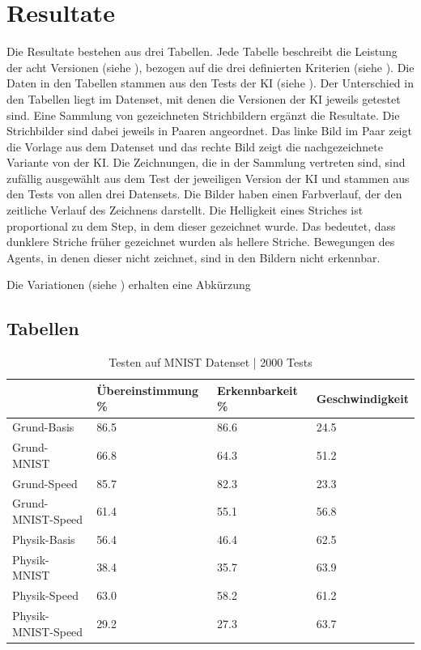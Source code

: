 \chapter{Resultate}\label{chap:r}
Die Resultate bestehen aus drei Tabellen. Jede Tabelle beschreibt die Leistung
der acht Versionen (siehe ), bezogen auf die drei
definierten Kriterien (siehe ). Die Daten in den Tabellen
stammen aus den Tests der KI (siehe ). Der Unterschied
in den Tabellen liegt im Datenset, mit denen die Versionen der KI jeweils
getestet sind. Eine Sammlung von gezeichneten Strichbildern ergänzt die
Resultate. Die Strichbilder sind dabei jeweils in Paaren angeordnet. Das linke
Bild im Paar zeigt die Vorlage aus dem Datenset und das rechte Bild zeigt die
nachgezeichnete Variante von der KI. Die Zeichnungen, die in der Sammlung
vertreten sind, sind zufällig ausgewählt aus dem Test der jeweiligen Version der
KI und stammen aus den Tests von allen drei Datensets. Die Bilder haben einen
Farbverlauf, der den zeitliche Verlauf des Zeichnens darstellt. Die Helligkeit
eines Striches ist proportional zu dem Step, in dem dieser gezeichnet wurde. Das
bedeutet, dass dunklere Striche früher gezeichnet wurden als hellere Striche.
Bewegungen des Agents, in denen dieser nicht zeichnet, sind in den Bildern nicht
erkennbar.


Die Variationen (siehe ) erhalten eine Abkürzung %


\newpage
\section{Tabellen}\label{chap:r_tab}
\begin{table}[!ht]
    \centering
    \caption{Testen auf MNIST Datenset | 2000 Tests}\label{tab:MNIST}
    \begin{tabular}{|l|l|l|l|}
        \hline
            ~ & Übereinstimmung \% & Erkennbarkeit \% & Geschwindigkeit \\ \hline
            Grund-Basis & 86.5 & 86.6 & 24.5 \\ \hline
            Grund-MNIST & 66.8 & 64.3 & 51.2 \\ \hline
            Grund-Speed & 85.7 & 82.3 & 23.3 \\ \hline
            Grund-MNIST-Speed & 61.4 & 55.1 & 56.8 \\ \hline
            Physik-Basis & 56.4 & 46.4 & 62.5 \\ \hline
            Physik-MNIST & 38.4 & 35.7 & 63.9 \\ \hline
            Physik-Speed & 63.0 & 58.2 & 61.2 \\ \hline
            Physik-MNIST-Speed & 29.2 & 27.3 & 63.7 \\ \hline
        \end{tabular}
\end{table}

